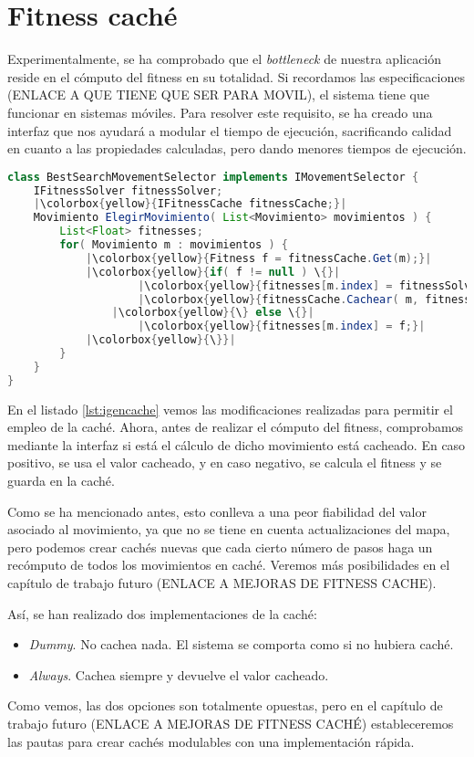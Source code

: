 \section{Fitness caché}

Experimentalmente, se ha comprobado que el \emph{bottleneck} de nuestra aplicación reside en el cómputo del fitness en su totalidad. Si recordamos las especificaciones (ENLACE A QUE TIENE QUE SER PARA MOVIL), el sistema tiene que funcionar en sistemas móviles. Para resolver este requisito, se ha creado una interfaz que nos ayudará a modular el tiempo de ejecución, sacrificando calidad en cuanto a las propiedades calculadas, pero dando menores tiempos de ejecución.

\begin{lstlisting}[caption={Interfaz de selección de movimiento basada en búsqueda con mejora de caché},label={lst:igencache},language=Java,escapechar=|]
class BestSearchMovementSelector implements IMovementSelector {
	IFitnessSolver fitnessSolver;
	|\colorbox{yellow}{IFitnessCache fitnessCache;}|
	Movimiento ElegirMovimiento( List<Movimiento> movimientos ) {
		List<Float> fitnesses;
		for( Movimiento m : movimientos ) {
			|\colorbox{yellow}{Fitness f = fitnessCache.Get(m);}|
			|\colorbox{yellow}{if( f != null ) \{}|
					|\colorbox{yellow}{fitnesses[m.index] = fitnessSolver.FuncionGuia( m );}|
					|\colorbox{yellow}{fitnessCache.Cachear( m, fitnesses[m.index] );}|
				|\colorbox{yellow}{\} else \{}|
					|\colorbox{yellow}{fitnesses[m.index] = f;}|
			|\colorbox{yellow}{\}}|
		}
	}
}
\end{lstlisting}


En el listado \ref{lst:igencache} vemos las modificaciones realizadas para permitir el empleo de la caché. Ahora, antes de realizar el cómputo del fitness, comprobamos mediante la interfaz si está el cálculo de dicho movimiento está cacheado. En caso positivo, se usa el valor cacheado, y en caso negativo, se calcula el fitness y se guarda en la caché.

Como se ha mencionado antes, esto conlleva a una peor fiabilidad del valor asociado al movimiento, ya que no se tiene en cuenta actualizaciones del mapa, pero podemos crear cachés nuevas que cada cierto número de pasos haga un recómputo de todos los movimientos en caché. Veremos más posibilidades en el capítulo de trabajo futuro (ENLACE A MEJORAS DE FITNESS CACHE).

Así, se han realizado dos implementaciones de la caché:

\begin{itemize}
	\item \emph{Dummy}. No cachea nada. El sistema se comporta como si no hubiera caché.
	\item \emph{Always}. Cachea siempre y devuelve el valor cacheado.
\end{itemize}

Como vemos, las dos opciones son totalmente opuestas, pero en el capítulo de trabajo futuro (ENLACE A MEJORAS DE FITNESS CACHÉ) estableceremos las pautas para crear cachés modulables con una implementación rápida.



